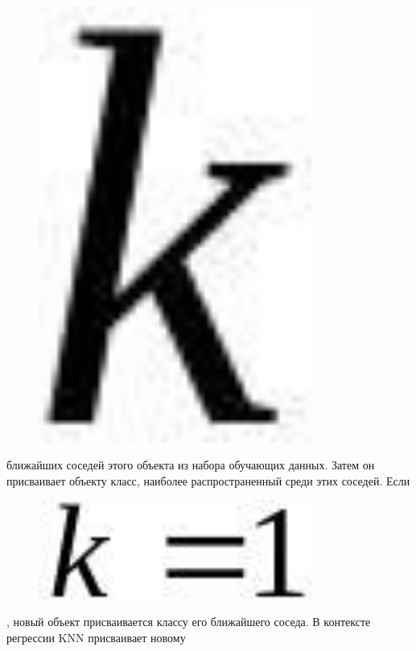 \begin{figure}[H]
	\centering
	\includegraphics[width=0.8\textwidth]{assets/92}
	\caption*{}
\end{figure} ближайших соседей этого объекта из
набора обучающих данных. Затем он присваивает объекту класс, наиболее
распространенный среди этих соседей. Если
\begin{figure}[H]
	\centering
	\includegraphics[width=0.8\textwidth]{assets/94}
	\caption*{}
\end{figure}, новый объект присваивается классу
его ближайшего соседа. В контексте регрессии KNN присваивает новому
